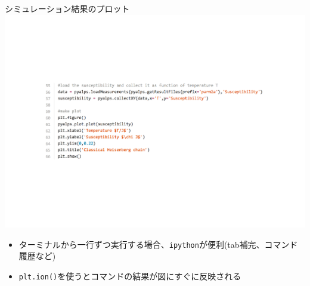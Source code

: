 \subsection*{\redm\whiteb\greenb}
\begin{frame}[t,fragile]{シミュレーション結果のプロット}
  \includegraphics[height=.5\textheight]{tutorial2a-3.pdf}
  \begin{itemize}
  \item ターミナルから一行ずつ実行する場合、{\color{red}\tt ipython}が便利(tab補完、コマンド履歴など)
  \item {\color{red}\tt plt.ion()}を使うとコマンドの結果が図にすぐに反映される
  \end{itemize}
\end{frame}

